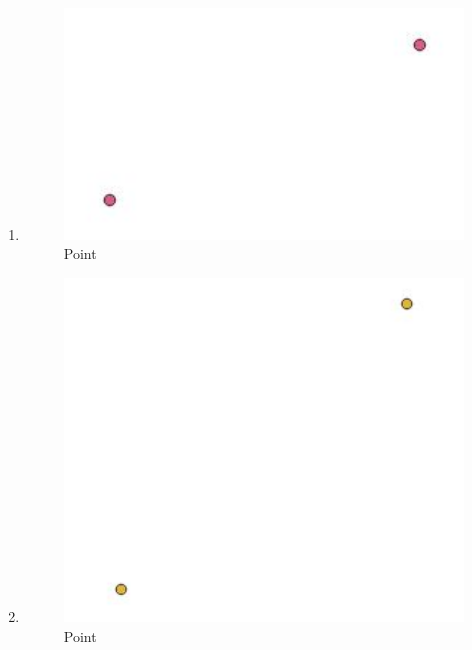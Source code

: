 \begin{enumerate}
	\item 
	
	\begin{figure}[H]
		\includegraphics[width=12cm]{figures/1174034/No3.JPG}
		\centering
		\caption{Point}
	\end{figure}
	
	\item 
	
	\begin{figure}[H]
		\includegraphics[width=12cm]{figures/1174042/No4.JPG}
		\centering
		\caption{Point}
	\end{figure}
	

\end{enumerate}
